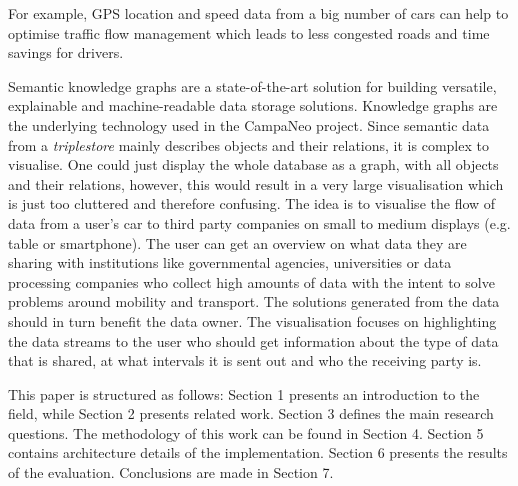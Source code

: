   For example, GPS location and speed data from a big number of cars can help to optimise traffic flow management which leads to less congested roads and time savings for drivers.
  
  Semantic knowledge graphs are a state-of-the-art solution for building versatile, explainable and machine-readable data storage solutions. Knowledge graphs are the underlying technology used in the CampaNeo project. 
  Since semantic data from a \textit{triplestore} mainly describes objects and their relations, it is complex to visualise. One could just display the whole database as a graph, with all objects and their relations, however, this would result in a very large visualisation which is just too cluttered and therefore confusing.
   The idea is to visualise the flow of data from a user's car to third party companies on small to medium displays (e.g. table or smartphone). The user can get an overview on what data they are sharing with institutions like governmental agencies, universities or data processing companies who collect high amounts of data with the intent to solve problems around mobility and transport. The solutions generated from the data should in turn benefit the data owner. The visualisation focuses on highlighting the data streams to the user who should get information about the type of data that is shared, at what intervals it is sent out and who the receiving party is.
   
   This paper is structured as follows: Section 1 presents an introduction to the field, while Section 2 presents related work. Section 3 defines the main research questions. The methodology of this work can be found in Section 4. Section 5 contains architecture details of the implementation. Section 6 presents the results of the evaluation. Conclusions are made in Section 7.
